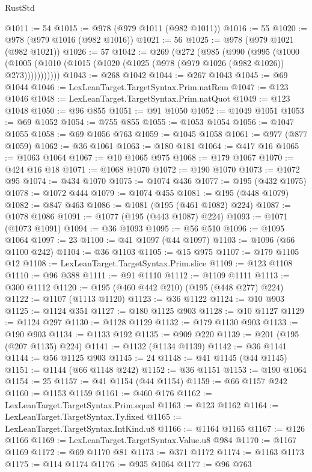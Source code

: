 \begin{lexlean}{RustStd}
\begin{coremodule}
{\begin{coremodule}
{{{{{{{{{{{{{{{{{{{{{{{{{{{{{{@1011 := 54
@1015 := @978 (@979 @1011 (@982 @1011))
@1016 := 55
@1020 := @978 (@979 @1016 (@982 @1016))
@1021 := 56
@1025 := @978 (@979 @1021 (@982 @1021))
@1026 := 57
@1042 := @269
    (@272
      (@985
        (@990
          (@995
            (@1000
              (@1005 (@1010 (@1015 (@1020 (@1025 (@978 (@979 @1026 (@982 @1026)) @273)))))))))))
@1043 := @268 @1042
@1044 := @267 @1043
@1045 := @69 @1044
@1046 := LexLeanTarget.TargetSyntax.Prim.natRem
@1047 := @123 @1046
@1048 := LexLeanTarget.TargetSyntax.Prim.natQuot
@1049 := @123 @1048
@1050 := @96 @855
@1051 := @91 @1050
@1052 := @1049 @1051
@1053 := @69 @1052
@1054 := @755 @855
@1055 := @1053 @1054
@1056 := @1047 @1055
@1058 := @69 @1056 @763
@1059 := @1045 @1058
@1061 := @977 (@877 @1059)
@1062 := @36 @1061
@1063 := @180 @181
@1064 := @417 @16
@1065 := @1063 @1064
@1067 := @10 @1065 @975
@1068 := @179 @1067
@1070 := @424 @16 @18
@1071 := @1068 @1070
@1072 := @190 @1070
@1073 := @1072 @95
@1074 := @434 @1070
@1075 := @1074 @436
@1077 := @195 (@432 @1075)
@1078 := @1072 @444
@1079 := @1074 @455
@1081 := @195 (@448 @1079)
@1082 := @847 @463
@1086 := @1081 (@195 (@461 @1082) @224)
@1087 := @1078 @1086
@1091 := @1077 (@195 (@443 @1087) @224)
@1093 := @1071 (@1073 @1091)
@1094 := @36 @1093
@1095 := @56 @510
@1096 := @1095 @1064
@1097 := 23
@1100 := @41 @1097 (@44 @1097)
@1103 := @1096 (@66 @1100 @242)
@1104 := @36 @1103
@1105 := @15 @975
@1107 := @179 @1105 @12
@1108 := LexLeanTarget.TargetSyntax.Prim.slice
@1109 := @123 @1108
@1110 := @96 @388
@1111 := @91 @1110
@1112 := @1109 @1111
@1113 := @300 @1112
@1120 := @195 (@460 @442 @210) (@195 (@448 @277) @224)
@1122 := @1107 (@1113 @1120)
@1123 := @36 @1122
@1124 := @10 @903
@1125 := @1124 @351
@1127 := @180 @1125 @903
@1128 := @10 @1127
@1129 := @1124 @297
@1130 := @1128 @1129
@1132 := @179 @1130 @903
@1133 := @190 @903
@1134 := @1133 @192
@1135 := @909 @220
@1139 := @201 (@195 (@207 @1135) @224)
@1141 := @1132 (@1134 @1139)
@1142 := @36 @1141
@1144 := @56 @1125 @903
@1145 := 24
@1148 := @41 @1145 (@44 @1145)
@1151 := @1144 (@66 @1148 @242)
@1152 := @36 @1151
@1153 := @190 @1064
@1154 := 25
@1157 := @41 @1154 (@44 @1154)
@1159 := @66 @1157 @242
@1160 := @1153 @1159
@1161 := @460 @176
@1162 := LexLeanTarget.TargetSyntax.Prim.equal
@1163 := @123 @1162
@1164 := LexLeanTarget.TargetSyntax.Ty.fixed
@1165 := LexLeanTarget.TargetSyntax.IntKind.u8
@1166 := @1164 @1165
@1167 := @126 @1166
@1169 := LexLeanTarget.TargetSyntax.Value.u8 @984
@1170 := @1167 @1169
@1172 := @69 @1170 @81
@1173 := @371 @1172
@1174 := @1163 @1173
@1175 := @114 @1174
@1176 := @935 @1064
@1177 := @96 @763
}}}}}}}}}}}}}}}}}}}}}}}}}}}}}}
\end{coremodule}}
\end{coremodule}
\end{lexlean}

